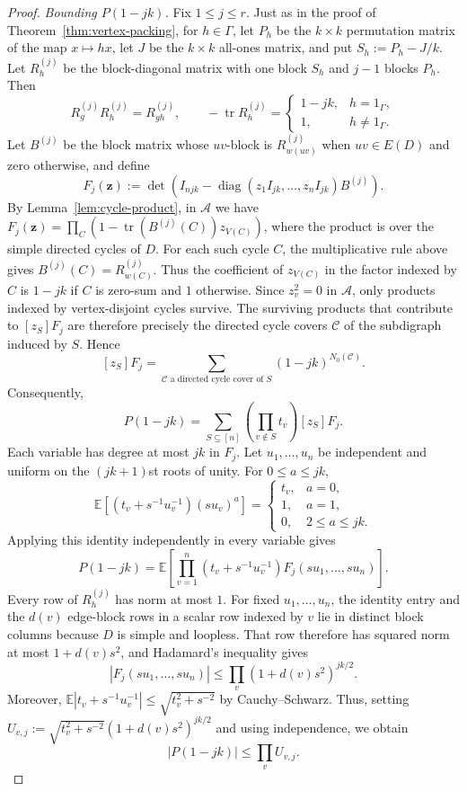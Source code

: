\documentclass[11pt]{amsart}
\theoremstyle{remark}
\newcommand{\tr}{\operatorname{tr}}
\newcommand{\diag}{\operatorname{diag}}
\begin{document}
\begin{proof}
\medskip\noindent
\emph{Bounding $P(1-jk)$.}
Fix $1\le j\le r$.  Just as in the proof of
Theorem~\ref{thm:vertex-packing}, for $h\in\Gamma$, let $P_h$ be the
$k\times k$ permutation matrix of the map $x\mapsto hx$, let $J$ be
the $k\times k$ all-ones matrix, and put $S_h:=P_h-J/k$.  Let
$R_h^{(j)}$ be the block-diagonal matrix with one block $S_h$ and
$j-1$ blocks $P_h$.
Then
\[
  R_g^{(j)}R_h^{(j)}=R_{gh}^{(j)},
  \qquad
  -\tr R_h^{(j)}=
  \begin{cases}
    1-jk,&h=1_\Gamma,\\
    1,&h\ne1_\Gamma.
  \end{cases}
\]
Let $B^{(j)}$ be the block matrix whose $uv$-block is
$R_{w(uv)}^{(j)}$ when $uv\in E(D)$ and zero otherwise, and define
\[
  F_j(\mathbf z)
  :=\det\left(
    I_{njk}-\diag(z_1I_{jk},\ldots,z_nI_{jk})B^{(j)}
  \right).
\]
By Lemma~\ref{lem:cycle-product}, in $\mathcal A$ we have
$F_j(\mathbf z)=\prod_C(1-\tr(B^{(j)}(C))z_{V(C)})$, where the product
is over the simple directed cycles of $D$.  For each such cycle $C$,
the multiplicative rule above gives
$B^{(j)}(C)=R_{w(C)}^{(j)}$.  Thus the coefficient of $z_{V(C)}$ in
the factor indexed by $C$ is $1-jk$ if $C$ is zero-sum and $1$
otherwise.  Since $z_v^2=0$ in $\mathcal A$, only products indexed by
vertex-disjoint cycles survive.  The surviving products that contribute
to $[z_S]F_j$ are therefore precisely the directed cycle covers
$\mathcal C$ of the subdigraph induced by $S$.  Hence
\[
  [z_S]F_j
  =\sum_{\mathcal C\text{ a directed cycle cover of }S}
  (1-jk)^{N_0(\mathcal C)}.
\]
Consequently,
\[
  P(1-jk)
  =
  \sum_{S\subseteq[n]}
  \left(\prod_{v\notin S}t_v\right)[z_S]F_j.
\]
Each variable has degree at most $jk$ in $F_j$.  Let
$u_1,\ldots,u_n$ be independent and uniform on the $(jk+1)$st roots
of unity.  For $0\le a\le jk$,
\[
  \mathbb E\left[(t_v+s^{-1}u_v^{-1})(su_v)^a\right]
  =
  \begin{cases}
    t_v,&a=0,\\
    1,&a=1,\\
    0,&2\le a\le jk.
  \end{cases}
\]
Applying this identity independently in every variable gives
\[
  P(1-jk)
  =\mathbb E\left[
    \prod_{v=1}^n(t_v+s^{-1}u_v^{-1})
    F_j(su_1,\ldots,su_n)
  \right].
\]
Every row of $R_h^{(j)}$ has norm at most $1$.  For fixed
$u_1,\ldots,u_n$, the identity entry and the $d(v)$ edge-block rows
in a scalar row indexed by $v$ lie in distinct block columns because
$D$ is simple and loopless.  That row therefore has squared norm at
most $1+d(v)s^2$, and Hadamard's inequality gives
\[
  |F_j(su_1,\ldots,su_n)|
  \le\prod_v(1+d(v)s^2)^{jk/2}.
\]
Moreover,
$\mathbb E|t_v+s^{-1}u_v^{-1}|\le\sqrt{t_v^2+s^{-2}}$ by
Cauchy--Schwarz.  Thus, setting
$U_{v,j}:=\sqrt{t_v^2+s^{-2}}(1+d(v)s^2)^{jk/2}$ and using
independence, we obtain
\begin{equation}\label{eq:eulerian-packing-upper}
  |P(1-jk)|\le\prod_vU_{v,j}.
\end{equation}


\end{proof}
\end{document}
